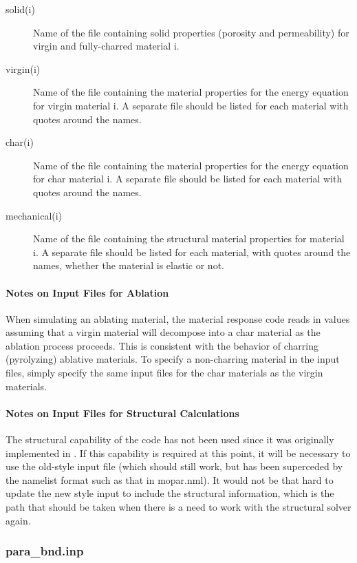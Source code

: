 \documentclass[]{article}
\begin{document}
\begin{description}
\item[solid(i)] Name of the file containing solid properties (porosity and permeability) for virgin and fully-charred material i.
\item[virgin(i)] Name of the file containing the material properties for the energy equation for virgin material i. A separate file should be listed for each material with quotes around the names.
\item[char(i)] Name of the file containing the material properties for the energy equation for char material i. A separate file should be listed for each material with quotes around the names.
\item[mechanical(i)] Name of the file containing the structural material properties for material i. A separate file should be listed for each material, with quotes around the names, whether the material is elastic or not.
\end{description}

\paragraph{Notes on Input Files for Ablation}

When simulating an ablating material, the material response code reads in values assuming that a virgin material will decompose into a char material as the ablation process proceeds. This is consistent with the behavior of charring (pyrolyzing) ablative materials. To specify a non-charring material in the input files, simply specify the same input files for the char materials as the virgin materials.

\paragraph{Notes on Input Files for Structural Calculations}

The structural capability of the code has not been used since it was originally implemented in \cite{wiebenga_thesis}.  If this capability is required at this point, it will be necessary to use the old-style input file (which should still work, but has been superceded by the namelist format such as that in mopar.nml).  It would not be that hard to update the new style input to include the structural information, which is the path that should be taken when there is a need to work with the structural solver again.

\subsubsection{para\_bnd.inp}
\end{document}
